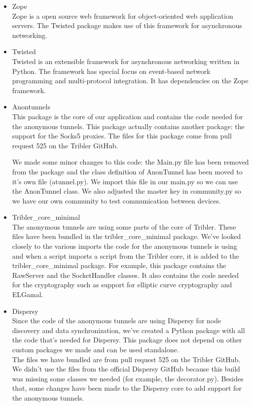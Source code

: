 \begin{itemize}
			\item Zope\\
			Zope is a open source web framework for object-oriented web application servers. The Twisted package makes use of this framework for asynchronous networking.
		
			\item Twisted\\
			Twisted is an extensible framework for asynchronous networking written in Python. The framework has special focus on event-based network programming and multi-protocol integration. It has dependencies on the Zope framework.
		
			\item Anontunnels\\
			This package is the core of our application and contains the code needed for the anonymous tunnels. This package actually contains another package: the support for the Socks5 proxies. The files for this package come from pull request 525 on the Tribler GitHub.
			
			We made some minor changes to this code: the Main.py file has been removed from the package and the class definition of AnonTunnel has been moved to it’s own file (atunnel.py). We import this file in our main.py so we can use the AnonTunnel class. We also adjusted the master key in community.py so we have our own community to test communication between devices.
			
			\item Tribler\_core\_minimal\\
			The anonymous tunnels are using some parts of the core of Tribler. These files have been bundled in the tribler\_core\_minimal package. We’ve looked closely to the various imports the code for the anonymous tunnels is using and when a script imports a script from the Tribler core, it is added to the tribler\_core\_minimal package. For example, this package contains the RawServer and the SocketHandler classes. It also contains the code needed for the cryptography such as support for elliptic curve cryptography and ELGamal.
			
			\item Dispersy\\
			Since the code of the anonymous tunnels are using Dispersy for node discovery and data synchronization, we’ve created a Python package with all the code that’s needed for Dispersy. This package does not depend on other custom packages we made and can be used standalone.\\
			The files we have bundled are from pull request 525 on the Tribler GitHub. We didn’t use the files from the official Dispersy GitHub because this build was missing some classes we needed (for example, the decorator.py). Besides that, some changes have been made to the Dispersy core to add support for the anonymous tunnels.
		
		\end{itemize}
	

